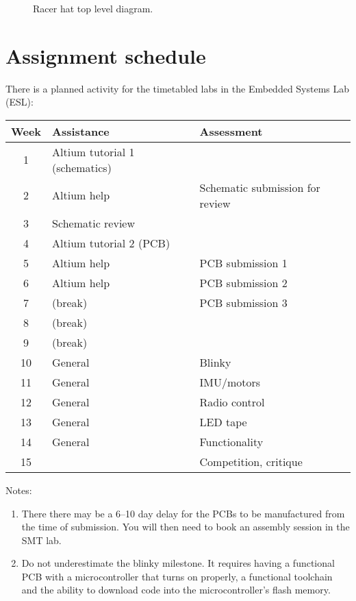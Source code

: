 \documentclass[11pt, a4paper]{article}
\begin{document}
\begin{figure}[h]
  \centering
  
  \caption{Racer hat top level diagram.}
\end{figure}


\pagebreak

\section{Assignment schedule}

There is a planned activity for the timetabled labs in the Embedded
Systems Lab (ESL):
%
\begin{flushleft}
  \begin{tabular}{ c l l }
    Week            &  Assistance  &  Assessment \\
    \hline \hline
    1 & Altium tutorial 1 (schematics)  & \\
    2 & Altium help       & Schematic submission for review  \\
    3 & Schematic review  &                \\
    4 & Altium tutorial 2 (PCB) &          \\
    5 & Altium help & PCB submission 1    \\
    6 & Altium help & PCB submission 2    \\
    7 & (break)     & PCB submission 3    \\
    8 & (break)     &                    \\
    9 & (break)     &                    \\
    10 & General    & Blinky            \\    
    11 & General    & IMU/motors        \\
    12 & General    & Radio control     \\
    13 & General    & LED tape          \\    
    14 & General    & Functionality     \\
    15 &            & Competition, critique  \\
  \end{tabular}
\end{flushleft}


Notes:
%
\begin{enumerate}
\item There there may be a 6--10 day delay for the PCBs to be
  manufactured from the time of submission.  You will then need to
  book an assembly session in the SMT lab.

\item Do not underestimate the blinky milestone.  It requires having a
  functional PCB with a microcontroller that turns on properly, a
  functional toolchain and the ability to download code into the
  microcontroller's flash memory.
\end{enumerate}
\end{document}

